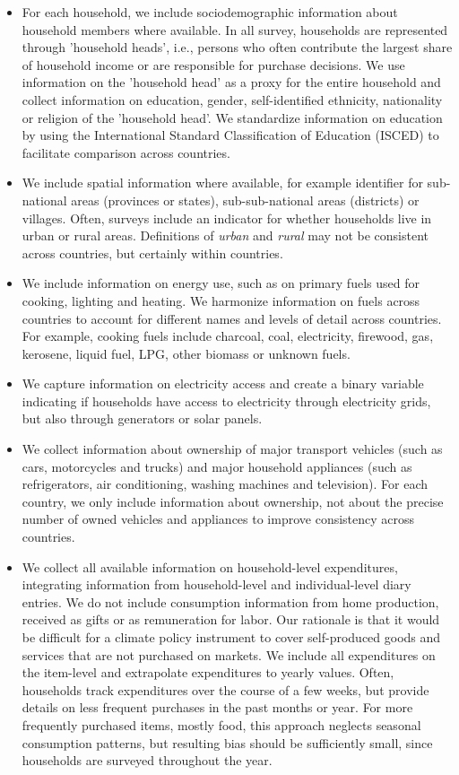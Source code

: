 \documentclass[12pt, a4paper]{article}
\begin{document}
\begin{refsection}
\begin{itemize}
    \item For each household, we include sociodemographic information about household members where available. In all survey, households are represented through 'household heads', i.e., persons who often contribute the largest share of household income or are responsible for purchase decisions. We use information on the 'household head' as a proxy for the entire household and collect information on education, gender, self-identified ethnicity, nationality or religion of the 'household head'. We standardize information on education by using the International Standard Classification of Education (ISCED) to facilitate comparison across countries.
    \item We include spatial information where available, for example identifier for sub-national areas (provinces or states), sub-sub-national areas (districts) or villages. Often, surveys include an indicator for whether households live in urban or rural areas. Definitions of \textit{urban} and \textit{rural} may not be consistent across countries, but certainly within countries.
    \item We include information on energy use, such as on primary fuels used for cooking, lighting and heating. We harmonize information on fuels across countries to account for different names and levels of detail across countries. For example, cooking fuels include charcoal, coal, electricity, firewood, gas, kerosene, liquid fuel, LPG, other biomass or unknown fuels.
    \item We capture information on electricity access and create a binary variable indicating if households have access to electricity through electricity grids, but also through generators or solar panels. 
    \item We collect information about ownership of major transport vehicles (such as cars, motorcycles and trucks) and major household appliances (such as refrigerators, air conditioning, washing machines and television). For each country, we only include information about ownership, not about the precise number of owned vehicles and appliances to improve consistency across countries.
    \item We collect all available information on household-level expenditures, integrating information from household-level and individual-level diary entries. We do not include consumption information from home production, received as gifts or as remuneration for labor. Our rationale is that it would be difficult for a climate policy instrument to cover self-produced goods and services that are not purchased on markets. We include all expenditures on the item-level and extrapolate expenditures to yearly values. Often, households track expenditures over the course of a few weeks, but provide details on less frequent purchases in the past months or year. For more frequently purchased items, mostly food, this approach neglects seasonal consumption patterns, but resulting bias should be sufficiently small, since households are surveyed throughout the year.

\end{itemize}
\end{refsection}
\end{document}
